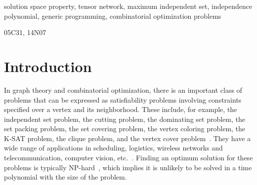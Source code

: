 \documentclass[onefignum, onetabnum]{siamart190516}
\newcommand{\<}{\langle}
\renewcommand{\>}{\rangle}
\newcommand{\blue}[1]{[{\bf  \color{blue}{JG: #1}}]}
\newcommand{\purple}[1]{[{\bf  \color{purple}{MC: #1}}]}
\newcounter{example}
\begin{document}
\begin{keywords}
solution space property, tensor network, maximum independent set, independence polynomial, generic programming, combinatorial optimization problems
\end{keywords}

\begin{AMS}
  05C31, 14N07
\end{AMS}

\section{Introduction}
In graph theory and combinatorial optimization, there is an important class of problems that can be expressed as satisfiability problems involving constraints specified over a vertex and its neighborhood.
These include, for example, the independent set problem, the cutting problem, the dominating set problem, the set packing problem, the set covering problem, the vertex coloring problem, the K-SAT problem, the clique problem, and the vertex cover problem~\cite{Moore2011}.
They have a wide range of applications in scheduling, logistics,
wireless networks and telecommunication, computer vision, etc.~\cite{Butenko2003, Wu2015}.
Finding an optimum solution for these problems is typically NP-hard~\cite{Hastad1996}, which implies it is unlikely to be solved in a time polynomial with the size of the problem.



\end{document}
